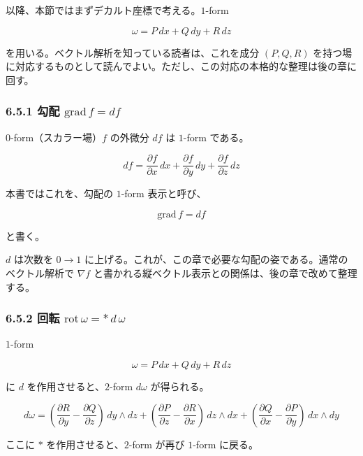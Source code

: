 \documentclass[a4paper,12pt,openany]{book}
\begin{document}
以降、本節ではまずデカルト座標で考える。\(1\)-form

\[
\omega = P\,dx + Q\,dy + R\,dz
\]

を用いる。ベクトル解析を知っている読者は、これを成分 \((P,Q,R)\)
を持つ場に対応するものとして読んでよい。ただし、この対応の本格的な整理は後の章に回す。

\hypertarget{ux52feux914d-mathrmgradf-df}{%
\subsubsection{\texorpdfstring{6.5.1 勾配
\(\mathrm{grad}\,f = df\)}{6.5.1 勾配 \textbackslash mathrm\{grad\}\textbackslash,f = df}}\label{ux52feux914d-mathrmgradf-df}}

\(0\)-form（スカラー場）\(f\) の外微分 \(df\) は \(1\)-form である。

\[
df = \frac{\partial f}{\partial x}\,dx
{}+ \frac{\partial f}{\partial y}\,dy
{}+ \frac{\partial f}{\partial z}\,dz
\]

本書ではこれを、勾配の \(1\)-form 表示と呼び、

\[
\mathrm{grad}\,f = df
\]

と書く。

\(d\) は次数を \(0 \to 1\)
に上げる。これが、この章で必要な勾配の姿である。通常のベクトル解析で
\(\nabla f\)
と書かれる縦ベクトル表示との関係は、後の章で改めて整理する。

\hypertarget{ux56deux8ee2-mathrmrotomega-astdomega}{%
\subsubsection{\texorpdfstring{6.5.2 回転
\(\mathrm{rot}\,\omega = \ast\,d\,\omega\)}{6.5.2 回転 \textbackslash mathrm\{rot\}\textbackslash,\textbackslash omega = \textbackslash ast\textbackslash,d\textbackslash,\textbackslash omega}}\label{ux56deux8ee2-mathrmrotomega-astdomega}}

\(1\)-form

\[
\omega = P\,dx + Q\,dy + R\,dz
\]

に \(d\) を作用させると、\(2\)-form \(d\omega\) が得られる。

\[d\omega = (\frac{\partial R}{\partial y} - \frac{\partial Q}{\partial z})\,dy \wedge dz + (\frac{\partial P}{\partial z} - \frac{\partial R}{\partial x})\,dz \wedge dx + (\frac{\partial Q}{\partial x} - \frac{\partial P}{\partial y})\,dx \wedge dy\]

ここに \(\ast\) を作用させると、\(2\)-form が再び \(1\)-form に戻る。
\end{document}
